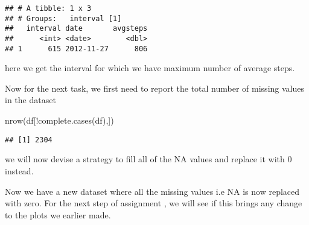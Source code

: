 \documentclass[
]{article}
\newenvironment{Shaded}{\begin{snugshade}}{\end{snugshade}}
\newcommand{\AttributeTok}[1]{\textcolor[rgb]{0.77,0.63,0.00}{#1}}
\newcommand{\FunctionTok}[1]{\textcolor[rgb]{0.00,0.00,0.00}{#1}}
\newcommand{\NormalTok}[1]{#1}
\newcommand{\OtherTok}[1]{\textcolor[rgb]{0.56,0.35,0.01}{#1}}
\newcommand{\SpecialCharTok}[1]{\textcolor[rgb]{0.00,0.00,0.00}{#1}}
\newcommand{\StringTok}[1]{\textcolor[rgb]{0.31,0.60,0.02}{#1}}
\begin{document}
\begin{verbatim}
## # A tibble: 1 x 3
## # Groups:   interval [1]
##   interval date       avgsteps
##      <int> <date>        <dbl>
## 1      615 2012-11-27      806
\end{verbatim}

here we get the interval for which we have maximum number of average
steps.

Now for the next task, we first need to report the total number of
missing values in the dataset

\begin{Shaded}
\begin{Highlighting}[]
\FunctionTok{nrow}\NormalTok{(df[}\SpecialCharTok{!}\FunctionTok{complete.cases}\NormalTok{(df),])}
\end{Highlighting}
\end{Shaded}

\begin{verbatim}
## [1] 2304
\end{verbatim}

we will now devise a strategy to fill all of the NA values and replace
it with 0 instead.

\begin{Shaded}
\end{Shaded}

Now we have a new dataset where all the missing values i.e NA is now
replaced with zero. For the next step of assignment , we will see if
this brings any change to the plots we earlier made.

\begin{Shaded}
\end{Shaded}
\end{document}
